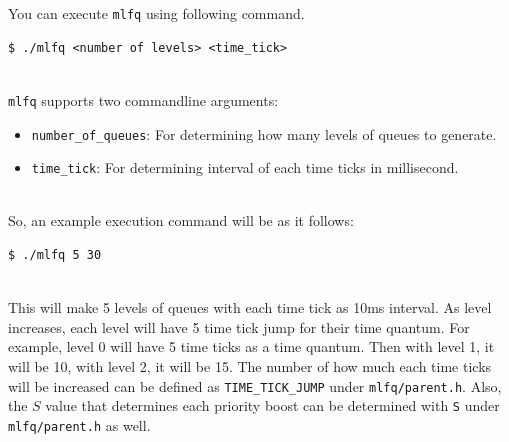 \documentclass{homework}
\begin{document}
You can execute \texttt{mlfq} using following command.
\\
\begin{center}
\begin{code}
\begin{verbatim}
$ ./mlfq <number of levels> <time_tick>
\end{verbatim}
\end{code}
\end{center}
\\
\texttt{mlfq} supports two commandline arguments:
\begin{itemize}
   \item \texttt{number_of_queues}: For determining how many levels of queues to generate.
   \item \texttt{time_tick}: For determining interval of each time ticks in millisecond.
\end{itemize}
\\
So, an example execution command will be as it follows:
\\
\begin{center}
\begin{code}
\begin{verbatim}
$ ./mlfq 5 30
\end{verbatim}
\end{code}
\end{center}
\\
This will make 5 levels of queues with each time tick as 10ms interval. As level increases, each level will have 5 time tick jump for their time quantum. For example, level 0 will have 5 time ticks as a time quantum. Then with level 1, it will be 10, with level 2, it will be 15. The number of how much each time ticks will be increased can be defined as \texttt{TIME_TICK_JUMP} under \texttt{mlfq/parent.h}. Also, the $S$ value that determines each priority boost can be determined with \texttt{S} under \texttt{mlfq/parent.h} as well. 
\end{document}
